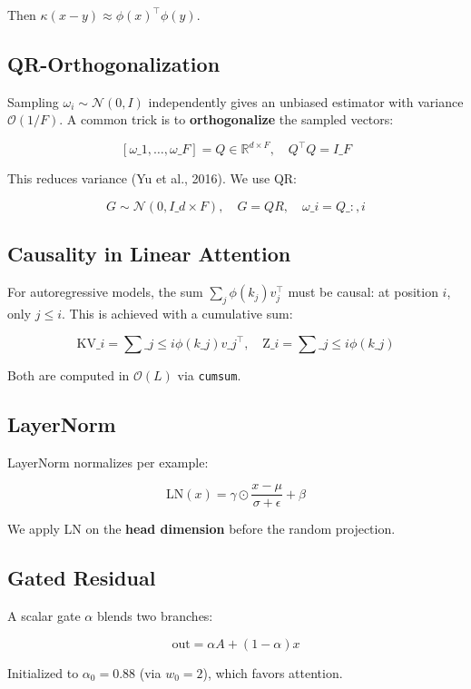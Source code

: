 Then $\kappa(x - y) \approx \phi(x)^\top \phi(y)$.

\subsection{QR-Orthogonalization}

Sampling $\omega_i \sim \mathcal{N}(0, I)$ independently gives an unbiased 
estimator with variance $\mathcal{O}(1/F)$. A common trick is to 
\textbf{orthogonalize} the sampled vectors:

\[
[\omega\_1, \dots, \omega\_F] = Q \in \mathbb{R}^{d \times F}, \quad Q^\top Q = I\_F
\tag{3.7}
\]

This reduces variance (Yu et al., 2016). We use QR:

\[
G \sim \mathcal{N}(0, I\_{d \times F}), \quad G = Q R, \quad \omega\_i = Q\_{:, i}
\tag{3.8}
\]

\subsection{Causality in Linear Attention}

For autoregressive models, the sum $\sum_j \phi(k_j) v_j^\top$ must be 
causal: at position $i$, only $j \leq i$. This is achieved with a 
cumulative sum:

\[
\text{KV}\_i = \sum\_{j \leq i} \phi(k\_j) v\_j^\top, \quad
\text{Z}\_i = \sum\_{j \leq i} \phi(k\_j)
\tag{3.9}
\]

Both are computed in $\mathcal{O}(L)$ via \texttt{cumsum}.

\subsection{LayerNorm}

LayerNorm normalizes per example:

\[
\text{LN}(x) = \gamma \odot \frac{x - \mu}{\sigma + \epsilon} + \beta
\tag{3.10}
\]

We apply LN on the \textbf{head dimension} before the random projection.

\subsection{Gated Residual}

A scalar gate $\alpha$ blends two branches:

\[
\text{out} = \alpha A + (1 - \alpha) x
\tag{3.11}
\]

Initialized to $\alpha_0 = 0.88$ (via $w_0 = 2$), which favors attention.

